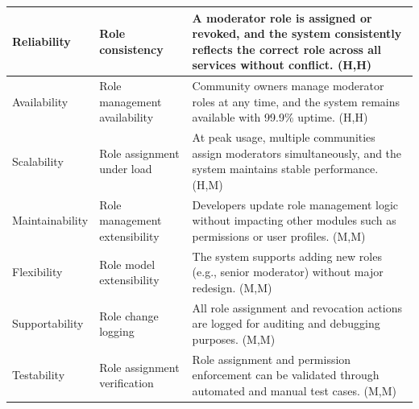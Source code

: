 \documentclass{article}
\begin{document}
\begin{table}[H]
\begin{tabular}{|p{3cm}|p{4cm}|p{7cm}|}
        Reliability
                                   & Role consistency
                                   & A moderator role is assigned or revoked, and the system consistently reflects the correct role across all services without conflict. (H,H)                              \\
        \hline

        Availability
                                   & Role management availability
                                   & Community owners manage moderator roles at any time, and the system remains available with 99.9\% uptime. (H,H)                                                         \\
        \hline

        Scalability
                                   & Role assignment under load
                                   & At peak usage, multiple communities assign moderators simultaneously, and the system maintains stable performance. (H,M)                                                \\
        \hline

        Maintainability
                                   & Role management extensibility
                                   & Developers update role management logic without impacting other modules such as permissions or user profiles. (M,M)                                                     \\
        \hline

        Flexibility
                                   & Role model extensibility
                                   & The system supports adding new roles (e.g., senior moderator) without major redesign. (M,M)                                                                             \\
        \hline

        Supportability
                                   & Role change logging
                                   & All role assignment and revocation actions are logged for auditing and debugging purposes. (M,M)                                                                        \\
        \hline

        Testability
                                   & Role assignment verification
                                   & Role assignment and permission enforcement can be validated through automated and manual test cases. (M,M)                                                              \\
        \hline
    \end{tabular}
\end{table}
\end{document}
